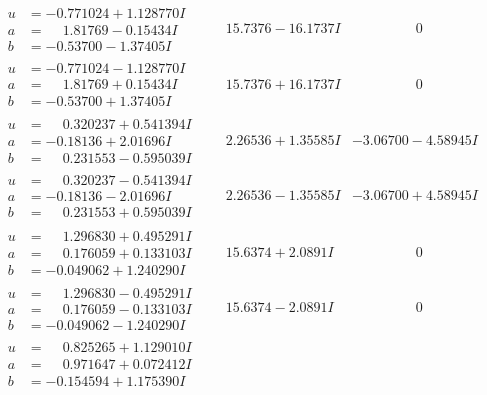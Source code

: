 \documentclass[1p]{elsarticle_modified}
\theoremstyle{definition}
\begin{document}
$$\begin{array}{c|c|c}
\begin{aligned}
u &= -0.771024 + 1.128770 I \\
a &= \phantom{-}1.81769 - 0.15434 I \\
b &= -0.53700 - 1.37405 I\end{aligned}
 & \phantom{-}15.7376 - 16.1737 I & \phantom{-0.000000 } 0 \\ \hline\begin{aligned}
u &= -0.771024 - 1.128770 I \\
a &= \phantom{-}1.81769 + 0.15434 I \\
b &= -0.53700 + 1.37405 I\end{aligned}
 & \phantom{-}15.7376 + 16.1737 I & \phantom{-0.000000 } 0 \\ \hline\begin{aligned}
u &= \phantom{-}0.320237 + 0.541394 I \\
a &= -0.18136 + 2.01696 I \\
b &= \phantom{-}0.231553 - 0.595039 I\end{aligned}
 & \phantom{-}2.26536 + 1.35585 I & -3.06700 - 4.58945 I \\ \hline\begin{aligned}
u &= \phantom{-}0.320237 - 0.541394 I \\
a &= -0.18136 - 2.01696 I \\
b &= \phantom{-}0.231553 + 0.595039 I\end{aligned}
 & \phantom{-}2.26536 - 1.35585 I & -3.06700 + 4.58945 I \\ \hline\begin{aligned}
u &= \phantom{-}1.296830 + 0.495291 I \\
a &= \phantom{-}0.176059 + 0.133103 I \\
b &= -0.049062 + 1.240290 I\end{aligned}
 & \phantom{-}15.6374 + 2.0891 I & \phantom{-0.000000 } 0 \\ \hline\begin{aligned}
u &= \phantom{-}1.296830 - 0.495291 I \\
a &= \phantom{-}0.176059 - 0.133103 I \\
b &= -0.049062 - 1.240290 I\end{aligned}
 & \phantom{-}15.6374 - 2.0891 I & \phantom{-0.000000 } 0 \\ \hline\begin{aligned}
u &= \phantom{-}0.825265 + 1.129010 I \\
a &= \phantom{-}0.971647 + 0.072412 I \\
b &= -0.154594 + 1.175390 I\end{aligned}

\end{array}$$
\end{document}
